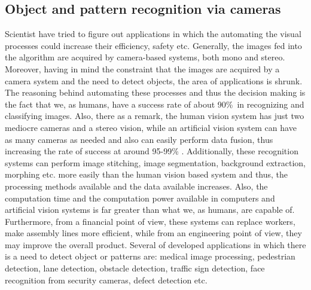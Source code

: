 \documentclass[12pt,a4paper,twoside]{report}
\begin{document}
\subsection{Object and pattern recognition via cameras}
Scientist have tried to figure out applications in which the automating the visual processes could increase their efficiency, safety etc. Generally, the images fed into the algorithm are acquired by camera-based systems, both mono and stereo. Moreover, having in mind the constraint that the images are acquired by a camera system and the need to detect objects, the area of applications is shrunk. The reasoning behind automating these processes and thus the decision making is the fact that we, as humans, have a success rate of about 90\%\ in recognizing and classifying images. Also, there as a remark, the human vision system has just two mediocre cameras and a stereo vision, while an artificial vision system can have as many cameras as needed and also can easily perform data fusion, thus increasing the rate of success at around 95-99\% \cite{article-studyhumandeep}\cite{article-cvapp}. Additionally, these recognition systems can perform image stitching, image segmentation, background extraction, morphing etc. more easily than the human vision based system and thus, the processing methods available and the data available increases\cite{article-lecungen}\cite{article-lecunhistory}. Also, the computation time and the computation power available in computers and artificial vision systems is far greater than what we, as humans, are capable of. Furthermore, from a financial point of view, these systems can replace workers, make assembly lines more efficient, while from an engineering point of view, they may improve the overall product. Several of developed applications in which there is a need to detect object or patterns are: medical image processing, pedestrian detection\cite{article-peddet}, lane detection, obstacle detection\cite{article-objlocaliz}, traffic sign detection\cite{article-ciresantraffic}, face recognition from security cameras, defect detection\cite{article-detandsegmmanu} etc.\par
\end{document}
